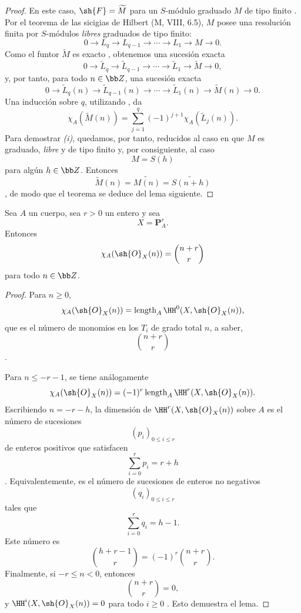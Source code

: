 \documentclass[oneside]{amsart}
\renewcommand{\leq}{\leqslant}
\renewcommand{\geq}{\geqslant}
\newcommand{\oldpage}[2][]{{\marginnote{\normalfont\textbf{#1}~|~#2}}\ignorespaces}
\let\EGAOriginalLabel\label
\renewcommand{\label}[1]{\phantomsection\EGAOriginalLabel{#1}}
\begin{document}
\begin{proof}
En este caso, $\sh{F}=\widetilde{M}$ para un $S$-módulo graduado $M$ de tipo finito .
Por el teorema de las sicigias de Hilbert (M, VIII, 6.5), $M$ posee una resolución finita por $S$-módulos \emph{libres} graduados de tipo finito:
\[
  0\longrightarrow L_q
  \longrightarrow L_{q-1}
  \longrightarrow\cdots
  \longrightarrow L_1
  \longrightarrow M
  \longrightarrow0.
\]
Como el funtor $\widetilde{M}$ es exacto , obtenemos una sucesión exacta
\[
  0\longrightarrow\widetilde{L}_q
  \longrightarrow\widetilde{L}_{q-1}
  \longrightarrow\cdots
  \longrightarrow\widetilde{L}_1
  \longrightarrow\widetilde{M}
  \longrightarrow0,
\]
y, por tanto, para todo $n\in\bb Z$, una sucesión exacta
\[
  0\longrightarrow\widetilde{L}_q(n)
  \longrightarrow\widetilde{L}_{q-1}(n)
  \longrightarrow\cdots
  \longrightarrow\widetilde{L}_1(n)
  \longrightarrow\widetilde{M}(n)
  \longrightarrow0.
\]
Una inducción sobre $q$, utilizando , da
\[
  \chi_A(\widetilde{M}(n))
  =
  \sum_{j=1}^{q}
  (-1)^{j+1}\chi_A(\widetilde{L}_j(n)).
\]
Para demostrar \emph{(i)}, quedamos, por tanto, reducidos al caso en que $M$ es graduado, \emph{libre} y de tipo finito y, por consiguiente, al caso
\[
  M=S(h)
\]
para algún $h\in\bb Z$.
Entonces
\[
  \widetilde{M}(n)
  =
  \widetilde{M(n)}
  =
  \widetilde{S(n+h)}
\]
, de modo que el teorema se deduce del lema siguiente.
\end{proof}

\oldpage[III]{111}
\begin{lemma}[2.5.3.1]
\label{III.2.5.3.1}
Sea $A$ un cuerpo, sea $r>0$ un entero y sea
\[
  X=\mathbf{P}_A^r.
\]
Entonces
\[
  \chi_A(\sh{O}_X(n))
  =
  \binom{n+r}{r}
\]
para todo $n\in\bb Z$.
\end{lemma}

\begin{proof}
Para $n\geq0$,
\[
  \chi_A(\sh{O}_X(n))
  =
  \operatorname{length}_A\HH^0(X,\sh{O}_X(n)),
\]
que es el número de monomios en los $T_i$ de grado total $n$, a saber,
\[
  \binom{n+r}{r}
\]
.

Para $n\leq-r-1$, se tiene análogamente
\[
  \chi_A(\sh{O}_X(n))
  =
  (-1)^r\operatorname{length}_A\HH^r(X,\sh{O}_X(n)).
\]
Escribiendo $n=-r-h$, la dimensión de $\HH^r(X,\sh{O}_X(n))$ sobre $A$ es el número de sucesiones
\[
  (p_i)_{0\leq i\leq r}
\]
de enteros positivos que satisfacen
\[
  \sum_{i=0}^{r}p_i=r+h
\]
.
Equivalentemente, es el número de sucesiones de enteros no negativos
\[
  (q_i)_{0\leq i\leq r}
\]
tales que
\[
  \sum_{i=0}^{r}q_i=h-1.
\]
Este número es
\[
  \binom{h+r-1}{r}
  =
  (-1)^r\binom{n+r}{r}.
\]
Finalmente, si $-r\leq n<0$, entonces
\[
  \binom{n+r}{r}=0,
\]
y $\HH^i(X,\sh{O}_X(n))=0$ para todo $i\geq0$ .
Esto demuestra el lema.
\end{proof}
\end{document}
